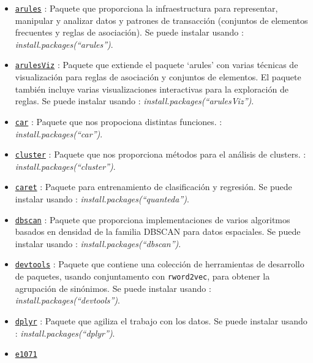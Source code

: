 \documentclass[spanish,]{article}
\begin{document}
\begin{itemize}
\item
  \href{https://cran.r-project.org/web/packages/arules/arules.pdf}{\texttt{arules}}
  : Paquete que proporciona la infraestructura para representar,
  manipular y analizar datos y patrones de transacción (conjuntos de
  elementos frecuentes y reglas de asociación). Se puede instalar usando
  : \emph{install.packages(``arules'')}.
\item
  \href{https://cran.r-project.org/web/packages/arulesViz/arulesViz.pdf}{\texttt{arulesViz}}
  : Paquete que extiende el paquete `arules' con varias técnicas de
  visualización para reglas de asociación y conjuntos de elementos. El
  paquete también incluye varias visualizaciones interactivas para la
  exploración de reglas. Se puede instalar usando :
  \emph{install.packages(``arulesViz'')}.
\item
  \href{https://cran.r-project.org/web/packages/car/car.pdf}{\texttt{car}}
  : Paquete que nos propociona distintas funciones. :
  \emph{install.packages(``car'')}.
\item
  \href{https://cran.r-project.org/web/packages/cluster/cluster.pdf}{\texttt{cluster}}
  : Paquete que nos proporciona métodos para el análisis de clusters. :
  \emph{install.packages(``cluster'')}.
\item
  \href{https://cran.r-project.org/web/packages/caret/caret.pdf}{\texttt{caret}}
  : Paquete para entrenamiento de clasificación y regresión. Se puede
  instalar usando : \emph{install.packages(``quanteda'')}.
\item
  \href{https://cran.r-project.org/web/packages/dbscan/dbscan.pdf}{\texttt{dbscan}}
  : Paquete que proporciona implementaciones de varios algoritmos
  basados en densidad de la familia DBSCAN para datos espaciales. Se
  puede instalar usando : \emph{install.packages(``dbscan'')}.
\item
  \href{https://cran.r-project.org/web/packages/devtools/devtools.pdf}{\texttt{devtools}}
  : Paquete que contiene una colección de herramientas de desarrollo de
  paquetes, usando conjuntamento con \texttt{rword2vec}, para obtener la
  agrupación de sinónimos. Se puede instalar usando :
  \emph{install.packages(``devtools'')}.
\item
  \href{https://cran.r-project.org/web/packages/dplyr/dplyr.pdf}{\texttt{dplyr}}
  : Paquete que agiliza el trabajo con los datos. Se puede instalar
  usando : \emph{install.packages(``dplyr'')}.
\item
  \href{https://cran.r-project.org/web/packages/e1071/e1071.pdf}{\texttt{e1071}}

\end{itemize}
\end{document}
